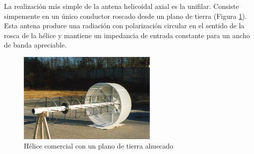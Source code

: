 \documentclass[12pt]{article}
\begin{document}
La realización más simple de la antena helicoidal axial es la unifilar. Consiste simpemente en un único conductor roscado desde un plano de tierra (Figura \ref{fig:helical_balanis}). Esta antena produce una radiación con polarización circular en el sentido de la rosca de la hélice y mantiene un impedancia de entrada constante para un ancho de banda apreciable.
\begin{figure}[h]
	\centering
	\includegraphics[width=0.60\textwidth]{helical_balanis.png}
	\caption{Hélice comercial con un plano de tierra ahuecado}
	\label{fig:helical_balanis}
\end{figure}

\newpage


\newpage

\printglossary[type=\acronymtype]

\newpage
\printglossary[type=main]
\end{document}
